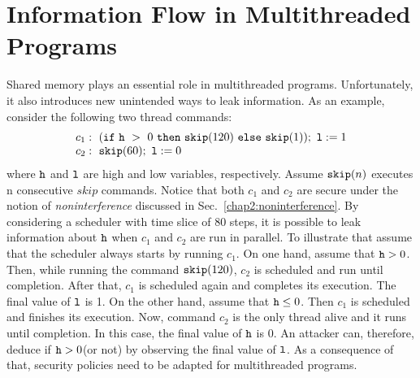 \documentclass[a4paper]{report}
\newcommand{\co}[1]{$\cod{#1}$}
\begin{document}
\section{Information Flow in Multithreaded Programs}
Shared memory plays an essential role in multithreaded programs. 
Unfortunately, it also introduces new unintended ways to leak information.
As an example, consider the following two thread commands:
\begin{equation}
 \begin{array}{l}
c_1:~(\ifthenelse{\cod{h}~>~0}{\cod{skip}(120)}{\cod{skip}(1)});~\cod{l}:=1 \\ 
c_2:~\cod{skip}(60);~\cod{l}:=0
 \end{array}
\label{chap2:example:multithread}
\end{equation}
where $\mathtt{h}$ and $\mathtt{l}$ are high and low variables,
respectively. 
Assume $\mathtt{skip}(n)$ executes n consecutive $skip$ commands.
Notice that both $c_1$ and $c_2$ are secure under the notion of {\em noninterference}
discussed in Sec.~\ref{chap2:noninterference}.
By considering a scheduler with time slice of 80 steps, it is possible
to leak information about \co{h} when $c_1$ and $c_2$ are run in parallel.
To illustrate that assume that the scheduler always starts by running $c_1$.
On one hand, assume that $\mathtt{h}>0$. Then, while running the command
$\mathtt{skip}(120)$, $c_2$ is scheduled and run until completion. After that,
$c_1$ is scheduled again and completes its execution. The final value of \co{l}
is 1. On the other hand, assume that $\mathtt{h}\leq 0$. Then $c_1$ is scheduled
and finishes its execution. Now, command $c_2$ is the only thread alive and it
runs until completion. In this case, the final value of \co{h} is 0. 
An attacker can, therefore, deduce if $\mathtt{h}>0$(or not) by observing the final
value of \co{l}. As a consequence of that, security policies need to be adapted
for multithreaded programs.
\end{document}
